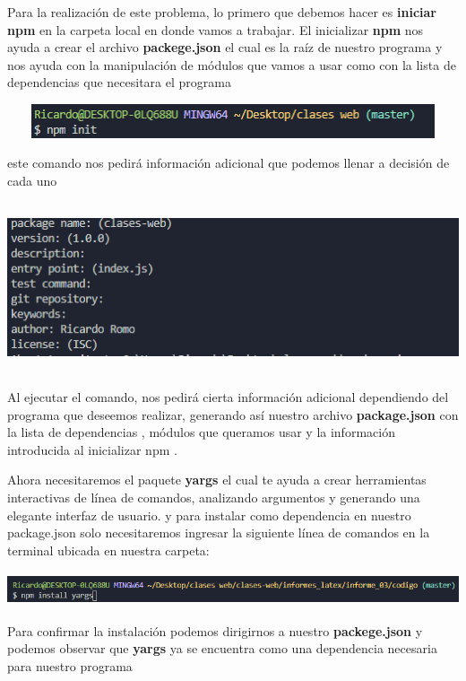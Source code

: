 \documentclass{report}
\begin{document}
  Para la realización de este problema, lo primero que debemos hacer es \textbf{iniciar npm} en la carpeta local en donde vamos a trabajar. El inicializar \textbf{npm} nos ayuda a crear el archivo \textbf{packege.json} el cual es la raíz de nuestro programa y nos ayuda con la manipulación de módulos que vamos a usar como con la lista de dependencias que necesitara el programa
  \begin{center}
    \includegraphics[width=15cm, height=1cm]{1.png}
  \end{center}
  este comando nos pedirá información adicional que podemos llenar a decisión de cada uno
    \begin{center}
    \includegraphics[width=15cm,height=5cm]{2.png}
  \end{center}
  Al ejecutar el comando, nos pedirá cierta información adicional dependiendo del programa que deseemos realizar, generando así nuestro archivo \textbf{package.json} con la lista de dependencias , módulos que queramos usar y la información introducida al inicializar npm .
   
  Ahora necesitaremos el paquete \textbf{yargs} el cual te ayuda a crear herramientas interactivas de línea de comandos, analizando argumentos y generando una elegante interfaz de usuario.
  y para instalar como dependencia en nuestro package.json solo necesitaremos ingresar la siguiente línea de comandos en la terminal ubicada en nuestra carpeta:
  \begin{center}
    \includegraphics[width=15cm, height=1cm]{3.png}
  \end{center}
  Para confirmar la instalación podemos dirigirnos a nuestro \textbf{packege.json} y podemos observar que \textbf{yargs} ya se encuentra como una dependencia necesaria para nuestro programa 
\end{document}
